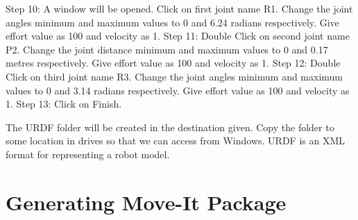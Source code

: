 \documentclass[a4paper,12pt,one side]{report}%
\begin{document}
Step 10: A window will be opened. Click on first joint name R1. Change the joint angles minimum and maximum values to 0 and 6.24 radians respectively. Give effort value as 100 and velocity as 1.\newline
Step 11: Double Click on second joint name P2. Change the joint distance minimum and maximum values to 0 and 0.17 metres respectively.  Give effort value as 100 and velocity as 1.\newline
Step 12: Double Click on third joint name R3. Change the joint angles minimum and maximum values to 0 and  3.14 radians respectively.  Give effort value as 100 and velocity as 1.\newline
Step 13: Click on Finish. \newline

The URDF folder will be created in the destination given. Copy the folder to some location in drives so that we can access from Windows. URDF is an XML format for representing a robot model.


\section{Generating Move-It Package }
\end{document}
